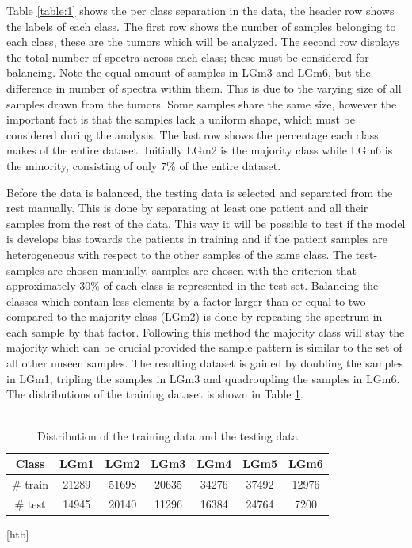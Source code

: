 Table \ref{table:1} shows the per class separation in the data, the header row shows the labels of each class. The first row shows the number of samples belonging to each class, these are the tumors which will be analyzed. The second row displays the total number of spectra across each class; these must be considered for balancing. Note the equal amount of samples in LGm3 and LGm6, but the difference in number of spectra within them. This is due to the varying size of all samples drawn from the tumors. Some samples share the same size, however the important fact is that the samples lack a uniform shape, which must be considered during the analysis. The last row shows the percentage each class makes of the entire dataset. Initially LGm2 is the majority class while LGm6 is the minority, consisting of only $7$\% of the entire dataset.

Before the data is balanced, the testing data is selected and separated from the rest manually. This is done by separating at least one patient and all their samples from the rest of the data. This way it will be possible to test if the model is develops bias towards the patients in training and if the patient samples are heterogeneous with respect to the other samples of the same class. The test-samples are chosen manually, samples are chosen with the criterion that approximately $30\%$ of each class is represented in the test set. Balancing the classes which contain less elements by a factor larger than or equal to two compared to the majority class (LGm2) is done by repeating the spectrum in each sample by that factor. Following this method the majority class will stay the majority which can be crucial provided the sample pattern is similar to the set of all other unseen samples. The resulting dataset is gained by doubling the samples in LGm1, tripling the samples in LGm3 and quadroupling the samples in LGm6. The distributions of the training dataset is shown in Table \ref{table:2}.
\\
\\
\begin{table}[htb]
\centering
 \begin{tabular}{||c c c c c c c||} 
 \hline
 Class & LGm1 & LGm2 & LGm3 & LGm4 & LGm5 & LGm6 \\ [0.5ex] 
 \hline\hline
 \# train & 21289	& 51698	& 20635	& 34276	& 37492	& 12976 \\
 \hline 
 \# test & 14945 & 20140 & 11296 & 16384 & 24764 & 7200 \\
 \hline

\end{tabular}[htb]
\caption{Distribution of the training data and the testing data}
\label{table:2}
\end{table}

